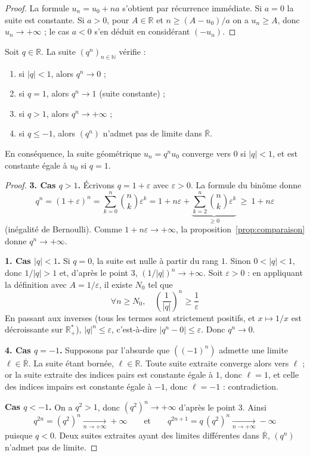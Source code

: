 \begin{proof}
La formule $u_n=u_0+na$ s'obtient par récurrence immédiate. Si $a=0$ la suite est constante. Si $a>0$, pour $A\in\mathbb{R}$ et $n\geq (A-u_0)/a$ on a $u_n\geq A$, donc $u_n\to+\infty$ ; le cas $a<0$ s'en déduit en considérant $(-u_n)$.
\end{proof}

\begin{prop}
\label{prop:suite-geometrique}
Soit $q\in\mathbb{R}$. La suite $(q^n)_{n\in\mathbb{N}}$ vérifie :
\begin{enumerate}
\item si $|q|<1$, alors $q^n\to 0$ ;
\item si $q=1$, alors $q^n\to 1$ (suite constante) ;
\item si $q>1$, alors $q^n\to+\infty$ ;
\item si $q\leq -1$, alors $(q^n)$ n'admet pas de limite dans $\overline{\mathbb{R}}$.
\end{enumerate}
En conséquence, la suite géométrique $u_n=q^n u_0$ converge vers $0$ si $|q|<1$, et est constante égale à $u_0$ si $q=1$.
\end{prop}

\begin{proof}
\textbf{3. Cas $q>1$.} Écrivons $q=1+\varepsilon$ avec $\varepsilon>0$. La formule du binôme donne
\[q^n = (1+\varepsilon)^n = \sum_{k=0}^{n}\binom{n}{k}\varepsilon^k = 1+n\varepsilon+\underbrace{\sum_{k=2}^{n}\binom{n}{k}\varepsilon^k}_{\geq 0}\ \geq\ 1+n\varepsilon\]
(inégalité de Bernoulli). Comme $1+n\varepsilon\to+\infty$, la proposition~\ref{prop:comparaison} donne $q^n\to+\infty$.

\textbf{1. Cas $|q|<1$.} Si $q=0$, la suite est nulle à partir du rang $1$. Sinon $0<|q|<1$, donc $1/|q|>1$ et, d'après le point 3, $(1/|q|)^n\to+\infty$. Soit $\varepsilon>0$ : en appliquant la définition avec $A=1/\varepsilon$, il existe $N_0$ tel que
\[\forall n\geq N_0,\quad \left(\frac{1}{|q|}\right)^{n}\geq\frac{1}{\varepsilon}\]
En passant aux inverses (tous les termes sont strictement positifs, et $x\mapsto 1/x$ est décroissante sur $\mathbb{R}_+^*$), $|q|^n\leq\varepsilon$, c'est-à-dire $|q^n-0|\leq\varepsilon$. Donc $q^n\to 0$.

\textbf{4. Cas $q=-1$.} Supposons par l'absurde que $((-1)^n)$ admette une limite $\ell\in\overline{\mathbb{R}}$. La suite étant bornée, $\ell\in\mathbb{R}$. Toute suite extraite converge alors vers $\ell$ ; or la suite extraite des indices pairs est constante égale à $1$, donc $\ell=1$, et celle des indices impairs est constante égale à $-1$, donc $\ell=-1$ : contradiction.

\textbf{Cas $q<-1$.} On a $q^2>1$, donc $(q^2)^n\to+\infty$ d'après le point 3. Ainsi
\[q^{2n}=(q^2)^n\xrightarrow[n\to+\infty]{}+\infty \qquad\text{et}\qquad q^{2n+1}=q\,(q^2)^n\xrightarrow[n\to+\infty]{}-\infty\]
puisque $q<0$. Deux suites extraites ayant des limites différentes dans $\overline{\mathbb{R}}$, $(q^n)$ n'admet pas de limite.
\end{proof}

